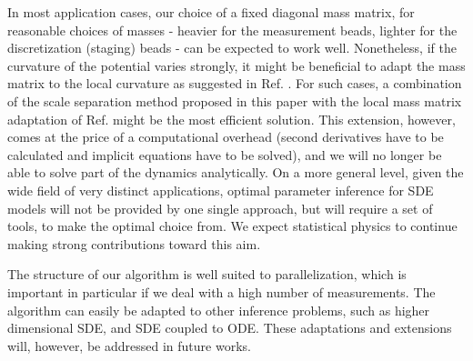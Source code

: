 \documentclass[11pt]{article}
\theoremstyle{definition}
\begin{document}
In most application cases, our choice of a fixed diagonal mass matrix, for reasonable choices of masses - heavier for the measurement beads, lighter for the discretization (staging) beads - can be expected to work well.
Nonetheless, if the curvature of the potential varies strongly, it might be beneficial to adapt the mass matrix to the local curvature as suggested in Ref. \cite{girolami_2011_HMC}. For such cases, a combination of the scale separation method proposed in this paper with the local mass matrix adaptation of Ref. \cite{girolami_2011_HMC} might be the most efficient solution. This extension, however, comes at the price of a computational overhead (second derivatives have to be calculated and implicit equations have to be solved), and we will no longer be able to solve part of the dynamics analytically.
On a more general level, given the wide field of very distinct applications, optimal parameter inference for SDE models will not be provided by one single approach, but will require a set of tools, to make the optimal choice from. We expect statistical physics to continue making strong contributions toward this aim.
 


The structure of our algorithm is well suited to parallelization, which is important in particular if we deal with a high number of measurements. The algorithm can easily be adapted to other inference problems, such as higher dimensional SDE, and SDE coupled to ODE. These adaptations and extensions will, however, be addressed in future works.
\end{document}
